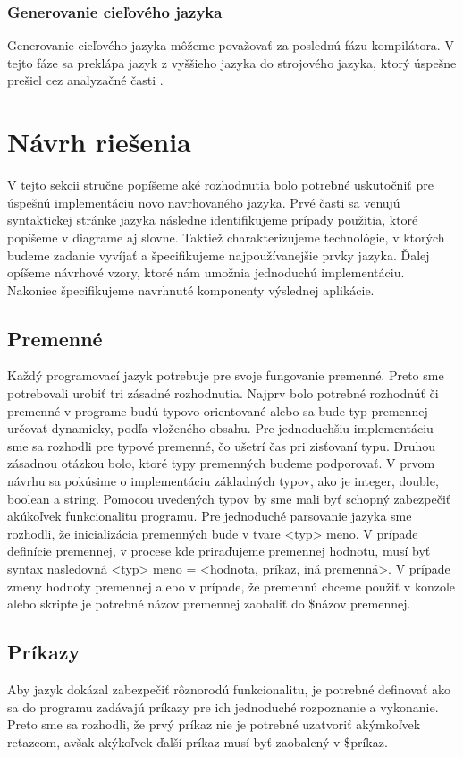 \subsubsection{Generovanie cieľového jazyka}
\indent Generovanie cieľového jazyka môžeme považovať za poslednú fázu kompilátora. V tejto fáze sa preklápa jazyk z vyššieho jazyka do strojového jazyka, ktorý úspešne prešiel cez analyzačné časti .\cite{gram}

\section{Návrh riešenia}
V tejto sekcii stručne popíšeme aké rozhodnutia bolo potrebné uskutočniť pre úspešnú implementáciu novo navrhovaného jazyka. Prvé časti sa venujú syntaktickej stránke jazyka následne identifikujeme prípady použitia, ktoré popíšeme v diagrame aj slovne. Taktiež charakterizujeme technológie, v ktorých budeme zadanie vyvíjať a špecifikujeme najpoužívanejšie prvky jazyka. Ďalej opíšeme návrhové vzory, ktoré nám umožnia jednoduchú implementáciu. Nakoniec špecifikujeme navrhnuté komponenty výslednej aplikácie.
\subsection{Premenné}
\indent Každý programovací jazyk potrebuje pre svoje fungovanie premenné. Preto sme potrebovali urobiť tri zásadné rozhodnutia. 
\newline
\indent Najprv bolo potrebné rozhodnúť či premenné v programe budú typovo orientované alebo sa bude typ premennej určovať dynamicky, podľa vloženého obsahu. Pre jednoduchšiu implementáciu sme sa rozhodli pre typové premenné, čo ušetrí čas pri zisťovaní typu. 
\newline
\indent Druhou zásadnou otázkou bolo, ktoré typy premenných budeme podporovať. V prvom návrhu sa pokúsime o implementáciu základných typov, ako je integer, double, boolean a string. Pomocou uvedených typov by sme mali byť schopný zabezpečiť akúkoľvek funkcionalitu programu. 
\newline
\indent Pre jednoduché parsovanie jazyka sme rozhodli, že inicializácia premenných bude v tvare <typ> meno. V prípade definície premennej, v procese kde priraďujeme premennej hodnotu, musí byť syntax nasledovná <typ> meno = <hodnota, príkaz, iná premenná>. V prípade zmeny hodnoty premennej alebo v prípade, že premennú chceme použiť v konzole alebo skripte je potrebné názov premennej zaobaliť do \${názov premennej}.
\subsection{Príkazy}
\indent Aby jazyk dokázal zabezpečiť rôznorodú funkcionalitu, je potrebné definovať ako sa do programu zadávajú príkazy pre ich jednoduché rozpoznanie a vykonanie. Preto sme sa rozhodli, že prvý príkaz nie je potrebné uzatvoriť akýmkoľvek reťazcom, avšak akýkoľvek ďalší príkaz musí byť zaobalený v \${príkaz}.
